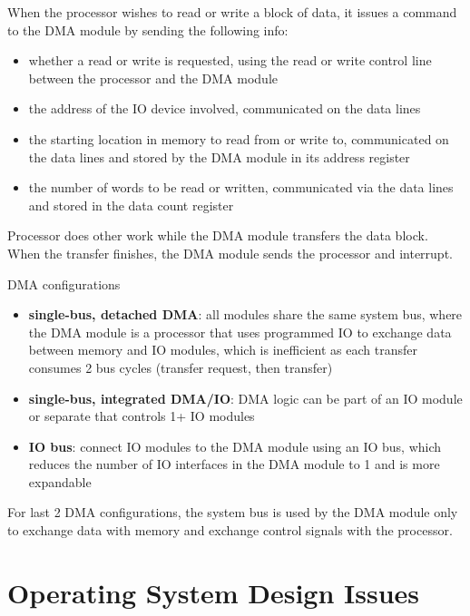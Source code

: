 \documentclass[11pt]{article}
\begin{document}
When the processor wishes to read or write a block of data, it issues a command to the DMA
module by sending the following info:
\begin{itemize}
\item whether a read or write is requested, using the read or write control line between the processor
and the DMA module
\item the address of the IO device involved, communicated on the data lines
\item the starting location in memory to read from or write to, communicated on the data lines and
stored by the DMA module in its address register
\item the number of words to be read or written, communicated via the data lines and stored in the
data count register
\end{itemize}

Processor does other work while the DMA module transfers the data block.
When the transfer finishes, the DMA module sends the processor and interrupt.

DMA configurations
\begin{itemize}
\item \textbf{single-bus, detached DMA}: all modules share the same system bus, where the DMA module
is a processor that uses programmed IO to exchange data between memory and IO modules,
which is inefficient as each transfer consumes 2 bus cycles (transfer request, then transfer)
\item \textbf{single-bus, integrated DMA/IO}: DMA logic can be part of an IO module or separate that controls
1+ IO modules
\item \textbf{IO bus}: connect IO modules to the DMA module using an IO bus, which reduces the number of IO
interfaces in the DMA module to 1 and is more expandable
\end{itemize}

For last 2 DMA configurations, the system bus is used by the DMA module only to exchange data with memory
and exchange control signals with the processor.
\section{Operating System Design Issues}
\label{sec:org165355e}
\end{document}
